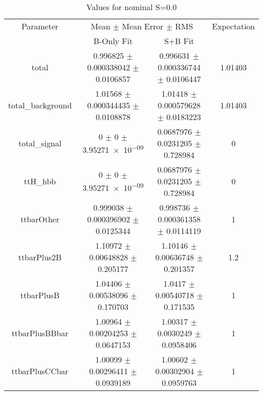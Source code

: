 \begin{table}
\centering
\caption{Values for nominal S=0.0}
\begin{tabular}{cccc}
\toprule
Parameter & \multicolumn{2}{c}{Mean $\pm$ Mean Error $\pm$ RMS} & Expectation\\
 & B-Only Fit & S+B Fit & \\
\midrule
total & \num{0.996825} $\pm$ \num{0.000338042} $\pm$ \num{0.0106857} & \num{0.996631} $\pm$ \num{0.000336744} $\pm$ \num{0.0106447} & \num{1.01403}\\
total\_background & \num{1.01568} $\pm$ \num{0.000344435} $\pm$ \num{0.0108878} & \num{1.01418} $\pm$ \num{0.000579628} $\pm$ \num{0.0183223} & \num{1.01403}\\
total\_signal & \num{0} $\pm$ \num{0} $\pm$ \num{3.95271e-09} & \num{0.0687976} $\pm$ \num{0.0231205} $\pm$ \num{0.728984} & \num{0}\\
ttH\_hbb & \num{0} $\pm$ \num{0} $\pm$ \num{3.95271e-09} & \num{0.0687976} $\pm$ \num{0.0231205} $\pm$ \num{0.728984} & \num{0}\\
ttbarOther & \num{0.999038} $\pm$ \num{0.000396902} $\pm$ \num{0.0125344} & \num{0.998736} $\pm$ \num{0.000361358} $\pm$ \num{0.0114119} & \num{1}\\
ttbarPlus2B & \num{1.10972} $\pm$ \num{0.00648828} $\pm$ \num{0.205177} & \num{1.10146} $\pm$ \num{0.00636748} $\pm$ \num{0.201357} & \num{1.2}\\
ttbarPlusB & \num{1.04406} $\pm$ \num{0.00538096} $\pm$ \num{0.170703} & \num{1.0417} $\pm$ \num{0.00540718} $\pm$ \num{0.171535} & \num{1}\\
ttbarPlusBBbar & \num{1.00964} $\pm$ \num{0.00204253} $\pm$ \num{0.0647153} & \num{1.00317} $\pm$ \num{0.0030249} $\pm$ \num{0.0958406} & \num{1}\\
ttbarPlusCCbar & \num{1.00099} $\pm$ \num{0.00296411} $\pm$ \num{0.0939189} & \num{1.00602} $\pm$ \num{0.00302904} $\pm$ \num{0.0959763} & \num{1}\\
\bottomrule
\end{tabular}
\end{table}
